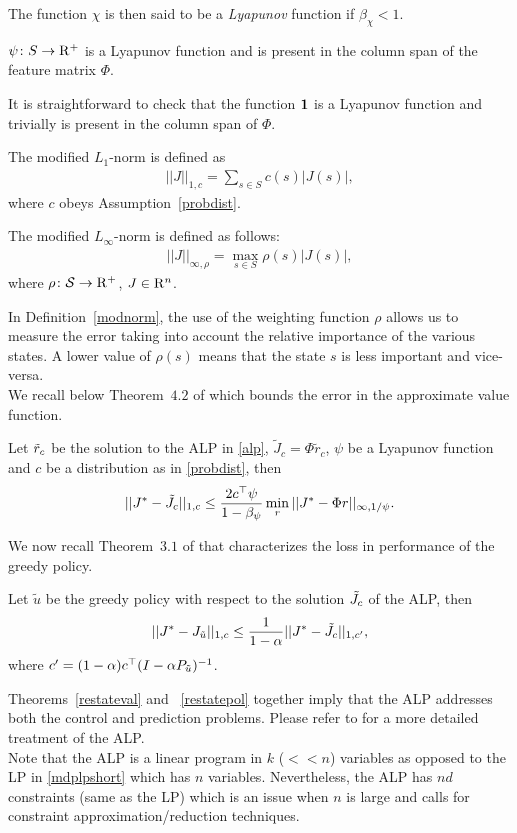\documentclass[12pt,draftcls,onecolumn]{IEEEtran}
\begin{document}
\begin{definition}
The function $\chi$ is then said to be a \emph{Lyapunov} function if $\beta_{\chi}<1$.
\end{definition}
\begin{assumption}\label{lyap}
$\psi\colon S \rightarrow \mathrm{R}^+$ is a Lyapunov function and is present in the column span of the feature matrix $\Phi$.
\end{assumption}
It is straightforward to check that the function $\mathbf{1}$ is a Lyapunov function and trivially is present in the column span of $\Phi$. 
\begin{definition}\label{modlone}
The modified $L_1$-norm is defined as
\begin{align}
||J||_{1,c}=\sum_{s \in S} c(s)|J(s)|,
\end{align}
where $c$ obeys Assumption~\ref{probdist}.
\end{definition}
\begin{definition}\label{modnorm}
The modified $L_\infty$-norm is defined as follows:
\begin{align}
||J||_{\infty,\rho}=\max_{s \in S} \rho(s) |J(s)|,
\end{align}
where $\rho \colon \mathcal{S} \rightarrow \mathrm{R}^+$, $J\in \mathrm{R}^n$.
\end{definition}
In Definition~\ref{modnorm}, the use of the weighting function $\rho$ allows us to measure the error taking into account the relative importance of the various states. A lower value of $\rho(s)$ means that the state $s$ is less important and vice-versa.\\
We recall below Theorem~$4.2$ of \cite{ALP} which bounds the error in the approximate value function.
\begin{theorem}\label{restateval}
Let $\tilde{r}_c$ be the solution to the ALP in \eqref{alp}, $\tilde{J}_c=\Phi \tilde{r}_c$, $\psi$ be a Lyapunov function and $c$ be a distribution as in \eqref{probdist}, then 
\begin{align}
||J^*-\tilde{J}_c||_{1,c}\leq \frac{2c^\top \psi}{1-\beta_{\psi}}\min_{r}||J^*-\Phi r||_{\infty,1/\psi}.
\end{align}
\end{theorem}
We now recall Theorem~$3.1$ of \cite{ALP} that characterizes the loss in performance of the greedy policy.
\begin{theorem}\label{restatepol}
Let $\tilde{u}$ be the greedy policy with respect to the solution $\tilde{J}_c$ of the ALP, then 
\begin{align}
||J^*-J_{\tilde{u}}||_{1,c}\leq \frac{1}{1-\alpha}||J^*-\tilde{J}_c||_{1,c'},
\end{align}
where $c'=(1-\alpha)c^\top(I-\alpha P_{\tilde{u}})^{-1}$.
\end{theorem}
Theorems~\ref{restateval} and ~\ref{restatepol} together imply that the ALP addresses both the control and prediction problems. Please refer to \cite{ALP} for a more detailed treatment of the ALP.\\
Note that the ALP is a linear program in $k$ ($<<n$) variables as opposed to the LP in \eqref{mdplpshort} which has $n$ variables. Nevertheless, the ALP has $nd$ constraints (same as the LP) which is an issue when $n$ is large and calls for constraint approximation/reduction techniques.
\end{document}
